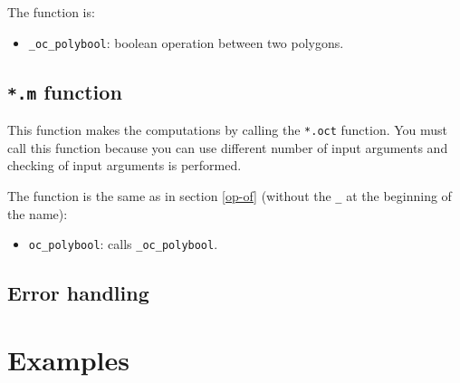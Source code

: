 \documentclass[10pt,a4paper]{article}
\begin{document}
The function is:
\begin{itemize}
\item \texttt{\_oc\_polybool}: boolean operation between two polygons.
\end{itemize}

\subsection{\texttt{*.m} function}

This function makes the computations by calling the \texttt{*.oct} function. You
must call this function because you can use different number of input arguments
and checking of input arguments is performed.

The function is the same as in section \ref{op-of} (without the \texttt{\_} at
the beginning of the name):
\begin{itemize}
\item \texttt{oc\_polybool}: calls \texttt{\_oc\_polybool}.
\end{itemize}

\subsection{Error handling}

%
%

\section{Examples}
\end{document}
